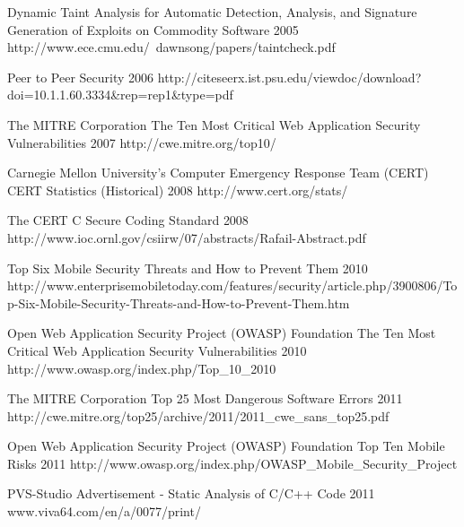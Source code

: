 \begin{thebibliography}{9}
		{
			\biband
			}
		{Dynamic Taint Analysis for Automatic Detection, Analysis, and Signature Generation of Exploits on Commodity Software}	
		{2005}	
		{http://www.ece.cmu.edu/~dawnsong/papers/taintcheck.pdf}
	
		{}
		{Peer to Peer Security}	
		{2006}
		{http://citeseerx.ist.psu.edu/viewdoc/download?doi=10.1.1.60.3334\&rep=rep1\&type=pdf}

		{The MITRE Corporation}
		{The Ten Most Critical Web Application Security Vulnerabilities}
		{2007}
		{http://cwe.mitre.org/top10/}

		{Carnegie Mellon University's Computer Emergency Response Team (CERT)}
		{CERT Statistics (Historical)}
		{2008}
		{http://www.cert.org/stats/}
				
		{
			\biband
			}
		{The {CERT} {C} Secure Coding Standard}
		{2008}
		{http://www.ioc.ornl.gov/csiirw/07/abstracts/Rafail-Abstract.pdf}
		
		{}
		{Top Six Mobile Security Threats and How to Prevent Them}
		{2010}
		{http://www.enterprisemobiletoday.com/features/security/article.php/3900806/Top-Six-Mobile-Security-Threats-and-How-to-Prevent-Them.htm}
		
		{Open Web Application Security Project (OWASP) Foundation}
		{The Ten Most Critical Web Application Security Vulnerabilities}
		{2010}
		{http://www.owasp.org/index.php/Top_10_2010}
	
		{The MITRE Corporation}
		{Top 25 Most Dangerous Software Errors}
		{2011}
		{http://cwe.mitre.org/top25/archive/2011/2011_cwe_sans_top25.pdf}
		
		{Open Web Application Security Project (OWASP) Foundation}
		{Top Ten Mobile Risks}
		{2011}
		{http://www.owasp.org/index.php/OWASP_Mobile_Security_Project}
		
		{
			\biband
			}
		{PVS-Studio Advertisement - Static Analysis of C/C++ Code}
		{2011}
		{www.viva64.com/en/a/0077/print/}



\end{thebibliography}
